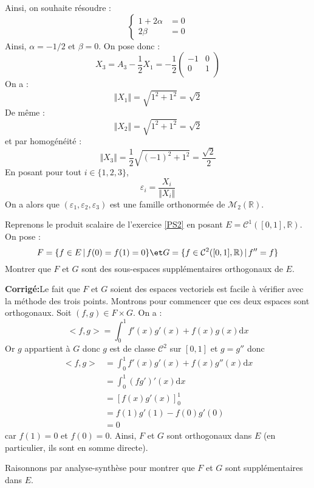 \documentclass[a4paper,twoside,french,11pt]{VcCours}
\newcommand{\dx}{\text{d}x}
\newcommand{\corr}{\textbf{Corrigé:}}
\begin{document}
Ainsi, on souhaite résoudre :
$$ \left\lbrace \begin{array}{rl}
1+ 2 \alpha & = 0 \\
2 \beta & = 0 
\end{array}\right.$$
Ainsi, $\alpha=-1/2$ et $\beta=0$.
On pose donc :
$$ X_3 = A_3 - \dfrac{1}{2} X_1 = -\dfrac{1}{2} \begin{pmatrix}
-1 & 0 \\
0 & 1 \\
\end{pmatrix}$$
On a :
$$ \Vert X_1 \Vert = \sqrt{1^2+1^2} = \sqrt{2}$$
De même :
$$ \Vert X_2 \Vert = \sqrt{1^2+1^2} = \sqrt{2}$$
et par homogénéité :
$$ \Vert X_3 \Vert = \dfrac{1}{2} \sqrt{(-1)^2+1^2} = \dfrac{\sqrt{2}}{2}$$
En posant pour tout $i \in \lbrace 1,2,3 \rbrace$,
$$ \varepsilon_i = \dfrac{X_i}{\Vert X_i \Vert}$$
On a alors que $(\varepsilon_1, \varepsilon_2, \varepsilon_3)$ est une famille orthonormée de $\mathcal{M}_2(\mathbb{R})$.

\begin{Exercice}{} Reprenons le produit scalaire de l'exercice \ref{PS2} en posant $E= \mathcal{C}^1([0,1],\mathbb{R})$. On pose :
$$ F = \lbrace f \in E \, \vert \, f(0)=f(1)=0\rbrace \et G= \lbrace f \in \mathcal{C}^2([0,1],\mathbb{R}) \, \vert \, f''=f \rbrace$$
Montrer que $F$ et $G$ sont des sous-espaces supplémentaires orthogonaux  de $E$.
\end{Exercice}

\corr Le fait que $F$ et $G$ soient des espaces vectoriels est facile à vérifier avec la méthode des trois points. Montrons pour commencer que ces deux espaces sont orthogonaux. Soit $(f,g) \in F \times G$. On a :
$$<f,g>= \int_{0}^1 f'(x)g'(x)+f(x)g(x) \dx$$
Or $g$ appartient à $G$ donc $g$ est de classe $\mathcal{C}^2$ sur $[0,1]$ et $g=g''$ donc 
\begin{align*}
 <f,g> & = \int_{0}^1 f'(x)g'(x)+f(x)g''(x) \dx \\
 & = \int_{0}^1 (fg')'(x) \dx \\
 &= \left[ f(x)g'(x) \right]_0^1 \\
 & = f(1)g'(1)-f(0)g'(0) \\
 & = 0
 \end{align*}
 car $f(1)=0$ et $f(0)=0$. Ainsi, $F$ et $G$ sont orthogonaux dans $E$ (en particulier, ils sont en somme directe).
 
  
 \noindent Raisonnons par analyse-synthèse pour montrer que $F$ et $G$ sont supplémentaires dans $E$.
 
\end{document}
